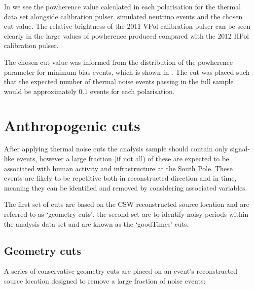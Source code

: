 In  we see the powherence value calculated in each polarisation for the thermal data set alongside calibration pulser, simulated neutrino events and the chosen cut value. The relative brightness of the 2011 VPol calibration pulser can be seen clearly in the large values of powherence produced compared with the 2012 HPol calibration pulser. 

The chosen cut value was informed from the distribution of the powherence parameter for minimum bias events, which is shown in . The cut was placed such that the expected number of thermal noise events passing in the full sample would be approximately $0.1$ events for each polarisation.


\section{Anthropogenic cuts}
\label{sec:Analysis:Anthropogenic-Cuts}

After applying thermal noise cuts the analysis sample should contain only signal-like events, however a large fraction (if not all) of these are expected to be associated with human activity and infrastructure at the South Pole. These events are likely to be repetitive both in reconstructed direction and in time, meaning they can be identified and removed by considering associated variables.

The first set of cuts are based on the CSW reconstructed source location and are referred to as `geometry cuts', the second set are to identify noisy periods within the analysis data set and are known as the `goodTimes' cuts.

\subsection{Geometry cuts}
\label{sec:Analysis:Anthropogenic-Cuts:Geometry-Cuts}

A series of conservative geometry cuts are placed on an event's reconstructed source location designed to remove a large fraction of noise events:

